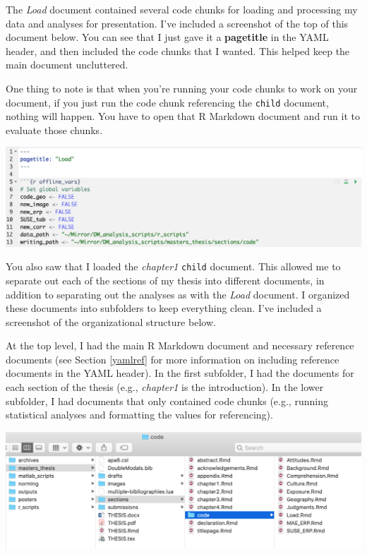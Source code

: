 \documentclass[
  openany]{book}
\begin{document}
The \emph{Load} document contained several code chunks for loading and processing my data and analyses for presentation. I've included a screenshot of the top of this document below. You can see that I just gave it a \textbf{pagetitle} in the YAML header, and then included the code chunks that I wanted. This helped keep the main document uncluttered.

One thing to note is that when you're running your code chunks to work on your document, if you just run the code chunk referencing the \texttt{child} document, nothing will happen. You have to open that R Markdown document and run it to evaluate those chunks.

\includegraphics[width=\textwidth]{images/content_child_setup}

You also saw that I loaded the \emph{chapter1} \texttt{child} document. This allowed me to separate out each of the sections of my thesis into different documents, in addition to separating out the analyses as with the \emph{Load} document. I organized these documents into subfolders to keep everything clean. I've included a screenshot of the organizational structure below.

At the top level, I had the main R Markdown document and necessary reference documents (see Section \ref{yamlref} for more information on including reference documents in the YAML header). In the first subfolder, I had the documents for each section of the thesis (e.g., \emph{chapter1} is the introduction). In the lower subfolder, I had documents that only contained code chunks (e.g., running statistical analyses and formatting the values for referencing).

\includegraphics[width=\textwidth]{images/content_organization}
\end{document}
